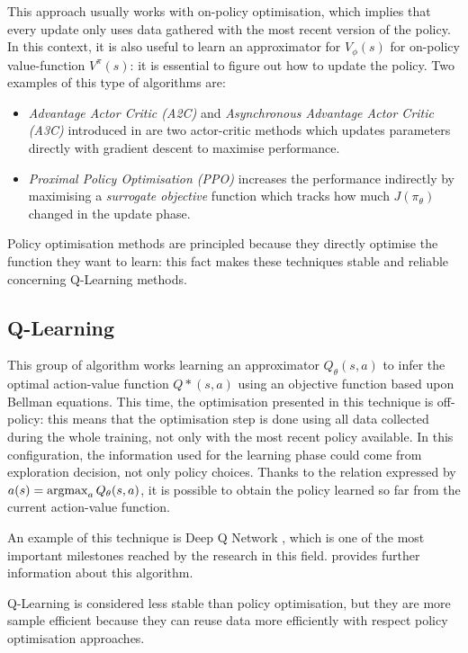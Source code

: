 This approach usually works with on-policy optimisation, which implies that every update only uses data gathered with the most recent version of the policy.
In this context, it is also useful to learn an approximator for $V_\phi(s)$ for on-policy value-function $V^\pi(s)$: it is essential to figure out how to update the policy.
Two examples of this type of algorithms are:
\begin{itemize}
	\item \textit{Advantage Actor Critic (A2C)} and \textit{Asynchronous Advantage Actor Critic (A3C)} introduced in \cite{mnih2016asynchronous} are two actor-critic methods which updates parameters directly with gradient descent to maximise performance.
	\item \textit{Proximal Policy Optimisation (PPO)} \cite{schulman2017proximal} increases the performance indirectly by maximising a \textit{surrogate objective} function which tracks how much $J(\pi_\theta)$ changed in the update phase.
\end{itemize}

Policy optimisation methods are principled because they directly optimise the function they want to learn: this fact makes these techniques stable and reliable concerning Q-Learning methods.

\subsection{Q-Learning}

This group of algorithm works learning an approximator $Q_\theta(s,a)$ to infer the optimal action-value function $Q*(s,a)$ using an objective function based upon Bellman equations.
This time, the optimisation presented in this technique is off-policy: this means that the optimisation step is done using all data collected during the whole training, not only with the most recent policy available. In this configuration, the information used for the learning phase could come from exploration decision, not only policy choices.
Thanks to the relation expressed by $a(s) = \operatornamewithlimits{argmax}_a Q_\theta(s,a)$, it is possible to obtain the policy learned so far from the current action-value function.

An example of this technique is Deep Q Network \cite{}, which is one of the most important milestones reached by the research in this field.   provides further information about this algorithm.

Q-Learning is considered less stable than policy optimisation, but they are more sample efficient because they can reuse data more efficiently with respect policy optimisation approaches.

